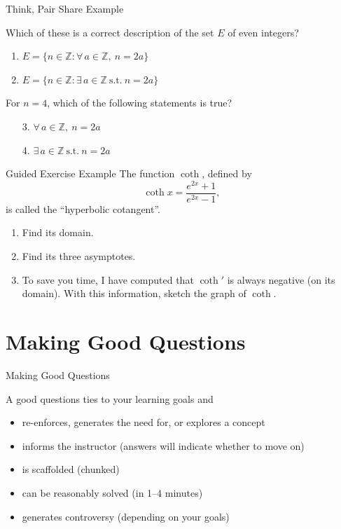 \documentclass[10pt, aspectratio=169, t]{beamer}
\begin{document}
\begin{frame}{Think, Pair Share Example}
		\begin{block}{}
			\Large
			Which of these is a correct description of the set $E$ of even integers?
			\begin{enumerate}
				\item $\displaystyle E=\{n\in \mathbb Z:\forall\, a\in\mathbb Z,\ n=2a\}$
				\item $\displaystyle E=\{n\in \mathbb Z:\exists\, a\in\mathbb Z\ \text{s.t.}\ n=2a\}$
			\end{enumerate}
		\end{block}
		\pause
		\begin{block}{}
			\Large
			For $n=4$, which of the following statements is true?
			\begin{enumerate}
				\item[3.] $\forall\, a\in\mathbb Z,\ n=2a$
				\item[4.] $\exists\, a\in\mathbb Z\ \text{s.t.}\ n=2a$
			\end{enumerate}
		\end{block}
\end{frame}

\begin{frame}{Guided Exercise Example}
			\Large
			The function $\coth$, defined by
			\alert{\[
				\coth x=\frac{e^{2x}+1}{e^{2x}-1},
			\]}
			is called the ``hyperbolic cotangent''.
			\begin{enumerate}
				\item Find its domain.
				\item Find its \alert{three} asymptotes.
				\item To save you time, I have computed that $\coth'$ is
always negative (on its domain). With this
information, sketch the graph of $\coth$.
			\end{enumerate}
\end{frame}

\section{Making Good Questions}

\begin{frame}{Making Good Questions}

\vspace{3em}

	A good questions ties to your learning goals and
	\begin{itemize}
		\item re-enforces, generates the need for, or explores a concept
		\item informs the instructor (answers will indicate whether to move on)
		\item is scaffolded (chunked)
		\item can be reasonably solved (in 1--4 minutes)
		\item generates controversy (depending on your goals)
	\end{itemize}

\end{frame}
\end{document}
